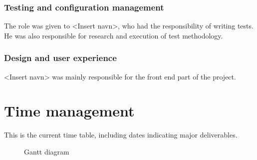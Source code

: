 \subsubsection{Testing and configuration management}

The role was given to <Insert navn>, who had the responsibility of writing tests. He was also responsible for research and execution of test methodology.

\subsubsection{Design and user experience}

<Insert navn> was mainly responsible for the front end part of the project. 
\section{Time management}

This is the current time table, including dates indicating major deliverables.

\begin{center}
  \begin{figure}
    \caption{Gantt diagram}
    \label{fig:gantt}
  \end{figure}
\end{center}

